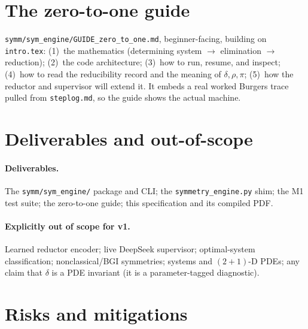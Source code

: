 \documentclass[11pt]{article}
\theoremstyle{definition}
\theoremstyle{remark}
\begin{document}
\section{The zero-to-one guide}

\texttt{symm/sym\_engine/GUIDE\_zero\_to\_one.md}, beginner-facing, building on \texttt{intro.tex}:
(1)~the mathematics (determining system $\to$ elimination $\to$ reduction); (2)~the code
architecture; (3)~how to run, resume, and inspect; (4)~how to read the reducibility record and the
meaning of $\delta,\rho,\pi$; (5)~how the reductor and supervisor will extend it. It embeds a real
worked Burgers trace pulled from \texttt{steplog.md}, so the guide shows the actual machine.

\section{Deliverables and out-of-scope}

\paragraph{Deliverables.} The \texttt{symm/sym\_engine/} package and CLI; the
\texttt{symmetry\_engine.py} shim; the M1 test suite; the zero-to-one guide; this specification and
its compiled PDF.

\paragraph{Explicitly out of scope for v1.} Learned reductor encoder; live DeepSeek supervisor;
optimal-system classification; nonclassical/BGI symmetries; systems and $(2{+}1)$-D PDEs; any claim
that $\delta$ is a PDE invariant (it is a parameter-tagged diagnostic).

\section{Risks and mitigations}
\end{document}
